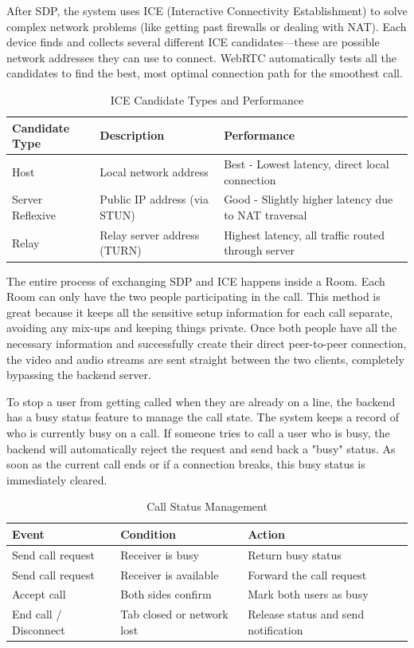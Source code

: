 \documentclass[a4paper,12pt]{report}
\begin{document}
After SDP, the system uses ICE (Interactive Connectivity Establishment) to solve complex network problems (like getting past firewalls or dealing with NAT). Each device finds and collects several different ICE candidates—these are possible network addresses they can use to connect. WebRTC automatically tests all the candidates to find the best, most optimal connection path for the smoothest call.

\begin{table}[H]
\centering
\begin{tabular}{|p{3cm}|p{5cm}|p{6cm}|}
\hline
\textbf{Candidate Type} & \textbf{Description} & \textbf{Performance} \\
\hline
Host & Local network address & Best - Lowest latency, direct local connection \\
\hline
Server Reflexive & Public IP address (via STUN) & Good - Slightly higher latency due to NAT traversal \\
\hline
Relay & Relay server address (TURN) & Highest latency, all traffic routed through server \\
\hline
\end{tabular}
\caption{ICE Candidate Types and Performance}
\label{tab:ice_candidates}
\end{table}

The entire process of exchanging SDP and ICE happens inside a Room. Each Room can only have the two people participating in the call. This method is great because it keeps all the sensitive setup information for each call separate, avoiding any mix-ups and keeping things private. Once both people have all the necessary information and successfully create their direct peer-to-peer connection, the video and audio streams are sent straight between the two clients, completely bypassing the backend server.

To stop a user from getting called when they are already on a line, the backend has a busy status feature to manage the call state. The system keeps a record of who is currently busy on a call. If someone tries to call a user who is busy, the backend will automatically reject the request and send back a "busy" status. As soon as the current call ends or if a connection breaks, this busy status is immediately cleared.

\begin{table}[H]
\centering
\begin{tabular}{|p{4cm}|p{4cm}|p{6.5cm}|}
\hline
\textbf{Event} & \textbf{Condition} & \textbf{Action} \\
\hline
Send call request & Receiver is busy & Return busy status \\
\hline
Send call request & Receiver is available & Forward the call request \\
\hline
Accept call & Both sides confirm & Mark both users as busy \\
\hline
End call / Disconnect & Tab closed or network lost & Release status and send notification \\
\hline
\end{tabular}
\caption{Call Status Management}
\label{tab:call_request}
\end{table}
\end{document}
